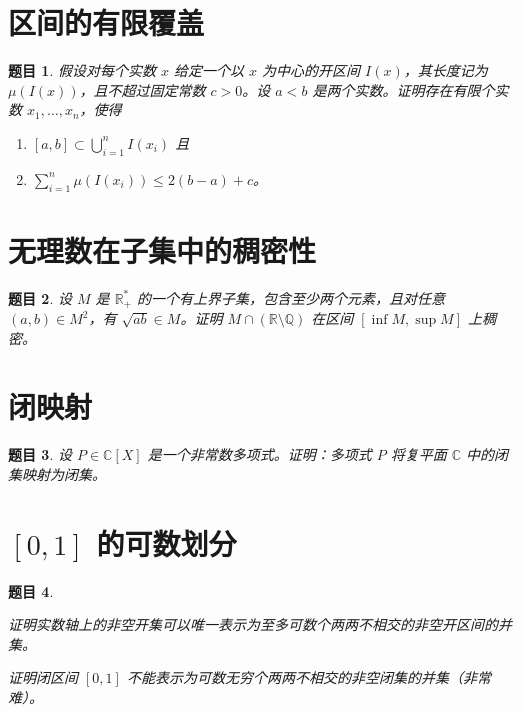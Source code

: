 \documentclass[12pt,UTF8,fontset=none]{ctexbook}
\theoremstyle{exercisestyle}
\newtheorem*{exercise}{题目}
\theoremstyle{solutionstyle}
\begin{document}
\section{区间的有限覆盖}
\begin{exercise}
假设对每个实数 \(x\) 给定一个以 \(x\) 为中心的开区间 \(I(x)\)，其长度记为 \(\mu(I(x))\)，且不超过固定常数 \(c > 0\)。设 \(a < b\) 是两个实数。证明存在有限个实数 \(x_1, \ldots, x_n\)，使得
\begin{enumerate}[label=(\textit{\roman*})]
\item \([a, b] \subset \bigcup_{i=1}^{n} I(x_i)\) 且
\item \(\sum_{i=1}^{n} \mu(I(x_i)) \leqslant 2(b-a) + c\)。
\end{enumerate}
\end{exercise}

\section{无理数在子集中的稠密性}
\begin{exercise}
  设 \( M \) 是 \( \mathbb{R}^*_+ \) 的一个有上界子集，包含至少两个元素，且对任意 \( (a, b) \in M^2 \)，有 \( \sqrt{ab} \in M \)。证明 \( M \cap (\mathbb{R} \setminus \mathbb{Q}) \) 在区间 \( [\inf M, \sup M] \) 上稠密。
\end{exercise}

\section{闭映射}\label{application-fermee}
\begin{exercise}
  设 \( P \in \mathbb{C}[X] \) 是一个非常数多项式。证明：多项式 \( P \) 将复平面 \( \mathbb{C} \) 中的闭集映射为闭集。
\end{exercise}

\section{$[0,1]$ 的可数划分}
\begin{exercise}
  \begin{subquestions}
    \item 证明实数轴上的非空开集可以唯一表示为至多可数个两两不相交的非空开区间的并集。
    \item 证明闭区间 \([0,1]\) 不能表示为可数无穷个两两不相交的非空闭集的并集（非常难）。
  \end{subquestions}
\end{exercise}
\end{document}
